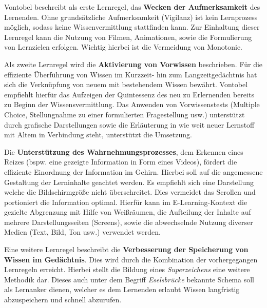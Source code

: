 Vontobel beschreibt als erste Lernregel, das \textbf{Wecken der Aufmerksamkeit} des Lernenden. Ohne grundsätzliche Aufmerksamkeit (Vigilanz) ist kein Lernprozess möglich, sodass keine Wissenvermittlung stattfinden kann. Zur Einhaltung dieser Lernregel kann die Nutzung von Filmen, Animationen, sowie die Formulierung von Lernzielen erfolgen. Wichtig hierbei ist die Vermeidung von Monotonie. \cite[S. 10f.]{Vontobel.2006} %

Als zweite Lernregel wird die \textbf{Aktivierung von Vorwissen} beschrieben. Für die effiziente Überführung von Wissen im Kurzzeit- hin zum Langzeitgedächtnis hat sich die Verknüpfung von neuem mit bestehendem Wissen bewährt. Vontobel empfiehlt hierfür das Aufzeigen der Quintessenz des neu zu Erlernenden bereits zu Beginn der Wissensvermittlung. Das Anwenden von Vorwissenstests (Multiple Choice, Stellungnahme zu einer formulierten Fragestellung usw.) unterstützt durch grafische Darstellungen sowie die Erläuterung in wie weit neuer Lernstoff mit Altem in Verbindung steht, unterstützt die Umsetzung. \cite[S. 11f.]{Vontobel.2006} %

Die \textbf{Unterstützung des Wahrnehmungsprozesses}, dem Erkennen eines Reizes (bspw. eine gezeigte Information in Form eines Videos), fördert die effiziente Einordnung der Information im Gehirn. Hierbei soll auf die angemessene Gestaltung der Lerninhalte geachtet werden. Es empfiehlt sich eine Darstellung welche die Bildschirmgröße nicht überschreitet. Dies vermeidet das Scrollen und portioniert die Information optimal. Hierfür kann im E-Learning-Kontext die gezielte Abgrenzung mit Hilfe von Weißräumen, die Aufteilung der Inhalte auf mehrere Darstellungsseiten (Screens), sowie die abwechselnde Nutzung diverser Medien (Text, Bild, Ton usw.) verwendet werden.\cite[S. 12f.]{Vontobel.2006} %

Eine weitere Lernregel beschreibt die \textbf{Verbesserung der Speicherung von Wissen im Gedächtnis}. Dies wird durch die Kombination der vorhergegangen Lernregeln erreicht. Hierbei stellt die Bildung eines \emph{Superzeichens} eine weitere Methodik dar. Dieses auch unter dem Begriff \emph{Eselsbrücke} bekannte Schema soll als Lernanker dienen, welcher es dem Lernenden erlaubt Wissen langfristig abzuspeichern und schnell abzurufen. \cite[S.14]{Vontobel.2006}   
        
